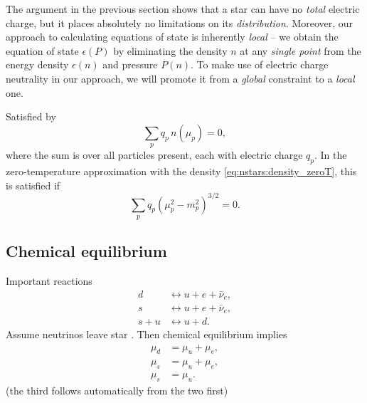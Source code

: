 

The argument in the previous section shows that a star can have no \emph{total} electric charge, but it places absolutely no limitations on its \emph{distribution}.
Moreover, our approach to calculating equations of state is inherently \emph{local} -- we obtain the equation of state $\epsilon(P)$ by eliminating the density $n$ at any \emph{single point} from the energy density $\epsilon(n)$ and pressure $P(n)$.
To make use of electric charge neutrality in our approach, we will promote it from a \emph{global} constraint to a \emph{local} one.




Satisfied by
\begin{equation}
	\sum_p q_p \, n(\mu_p) = 0 ,
\end{equation}
where the sum is over all particles present, each with electric charge $q_p$.
In the zero-temperature approximation with the density \eqref{eq:nstars:density_zeroT}, this is satisfied if
\begin{equation}
	\sum_p q_p \left( \mu_p^2 - m_p^2 \right)^{3/2} = 0 .
\end{equation}

\subsection{Chemical equilibrium}


Important reactions
\begin{subequations}
\begin{align}
	d     &\leftrightarrow u + e + \bar{\nu}_e, \\
	s     &\leftrightarrow u + e + \bar{\nu}_e, \\
	s + u &\leftrightarrow u + d .
\end{align}
\end{subequations}
Assume neutrinos leave star .
Then chemical equilibrium implies
\begin{subequations}
\begin{align}
	\mu_d &= \mu_u + \mu_e, \\
	\mu_s &= \mu_u + \mu_e, \\
	\mu_s &= \mu_u .
\end{align}
\end{subequations}
(the third follows automatically from the two first)


